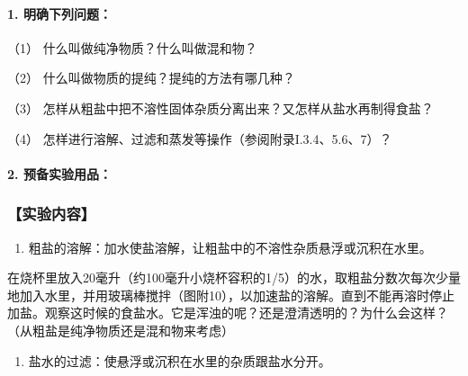 \paragraph{1. 明确下列问题：}

（1） 什么叫做纯净物质？什么叫做混和物？

（2） 什么叫做物质的提纯？提纯的方法有哪几种？

（3） 怎样从粗盐中把不溶性固体杂质分离出来？又怎样从盐水再制得食盐？

（4） 怎样进行溶解、过滤和蒸发等操作（参阅附录I.3.4、5.6、7）？

\paragraph{2. 预备实验用品：}

{\centering
\small\setlength{\tabcolsep}{3pt}%
\par
}

\subsubsection{【实验内容】}

\begin{enumerate}
\item
  粗盐的溶解：加水使盐溶解，让粗盐中的不溶性杂质悬浮或沉积在水里。
\end{enumerate}

在烧杯里放入20毫升（约100毫升小烧杯容积的1/5）的水，取粗盐分数次每次少量地加入水里，并用玻璃棒搅拌（图附10），以加速盐的溶解。直到不能再溶时停止加盐。观察这时候的食盐水。它是浑浊的呢？还是澄清透明的？为什么会这样？（从粗盐是纯净物质还是混和物来考虑）

\begin{enumerate}[start=2]
\item
  盐水的过滤：使悬浮或沉积在水里的杂质跟盐水分开。
\end{enumerate}


